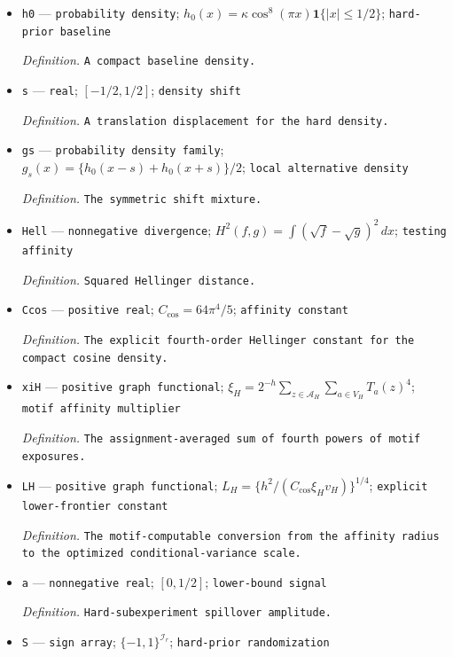 \documentclass{article}
\begin{document}
\begin{itemize}
  \item \texttt{h0} --- \texttt{probability density}; \(h_0(x)=\kappa\cos^8(\pi x)\mathbf1\{|x|\le1/2\}\); \texttt{hard-\allowbreak{}prior baseline}
  \par\smallskip\noindent\emph{Definition.} \texttt{A compact baseline density.}
  \item \texttt{s} --- \texttt{real}; \([-1/2,1/2]\); \texttt{density shift}
  \par\smallskip\noindent\emph{Definition.} \texttt{A translation displacement for the hard density.}
  \item \texttt{gs} --- \texttt{probability density family}; \(g_s(x)=\{h_0(x-s)+h_0(x+s)\}/2\); \texttt{local alternative density}
  \par\smallskip\noindent\emph{Definition.} \texttt{The symmetric shift mixture.}
  \item \texttt{Hell} --- \texttt{nonnegative divergence}; \(H^2(f,g)=\int(\sqrt f-\sqrt g)^2\,dx\); \texttt{testing affinity}
  \par\smallskip\noindent\emph{Definition.} \texttt{Squared Hellinger distance.}
  \item \texttt{Ccos} --- \texttt{positive real}; \(C_{\cos}=64\pi^4/5\); \texttt{affinity constant}
  \par\smallskip\noindent\emph{Definition.} \texttt{The explicit fourth-\allowbreak{}order Hellinger constant for the compact cosine density.}
  \item \texttt{xiH} --- \texttt{positive graph functional}; \(\xi_H=2^{-h}\sum_{z\in\mathcal A_H}\sum_{a\in V_H}T_a(z)^4\); \texttt{motif affinity multiplier}
  \par\smallskip\noindent\emph{Definition.} \texttt{The assignment-\allowbreak{}averaged sum of fourth powers of motif exposures.}
  \item \texttt{LH} --- \texttt{positive graph functional}; \(L_H=\{h^2/(C_{\cos}\xi_Hv_H)\}^{1/4}\); \texttt{explicit lower-\allowbreak{}frontier constant}
  \par\smallskip\noindent\emph{Definition.} \texttt{The motif-\allowbreak{}computable conversion from the affinity radius to the optimized conditional-\allowbreak{}variance scale.}
  \item \texttt{a} --- \texttt{nonnegative real}; \([0,1/2]\); \texttt{lower-\allowbreak{}bound signal}
  \par\smallskip\noindent\emph{Definition.} \texttt{Hard-\allowbreak{}subexperiment spillover amplitude.}
  \item \texttt{S} --- \texttt{sign array}; \(\{-1,1\}^{\mathcal I_r}\); \texttt{hard-\allowbreak{}prior randomization}

\end{itemize}
\end{document}

